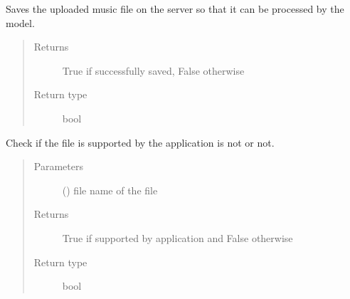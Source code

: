 \documentclass[letterpaper,10pt,english]{sphinxmanual}
\begin{document}

\begin{fulllineitems}
\label{\detokenize{docs/source/application.controllers:application.controllers.file_actions.save_file}}
Saves the uploaded music file on the server so that it can be processed by the model.
\begin{quote}\begin{description}
\item[{Returns}] \leavevmode
True if successfully saved, False otherwise

\item[{Return type}] \leavevmode
bool

\end{description}\end{quote}

\end{fulllineitems}


\begin{fulllineitems}
\label{\detokenize{docs/source/application.controllers:application.controllers.file_actions.supported_file}}
Check if the file is supported by the application is not or not.
\begin{quote}\begin{description}
\item[{Parameters}] \leavevmode
{} () \textendash{} file name of the file

\item[{Returns}] \leavevmode
True if supported by application and False otherwise

\item[{Return type}] \leavevmode
bool

\end{description}\end{quote}

\end{fulllineitems}
\end{document}
